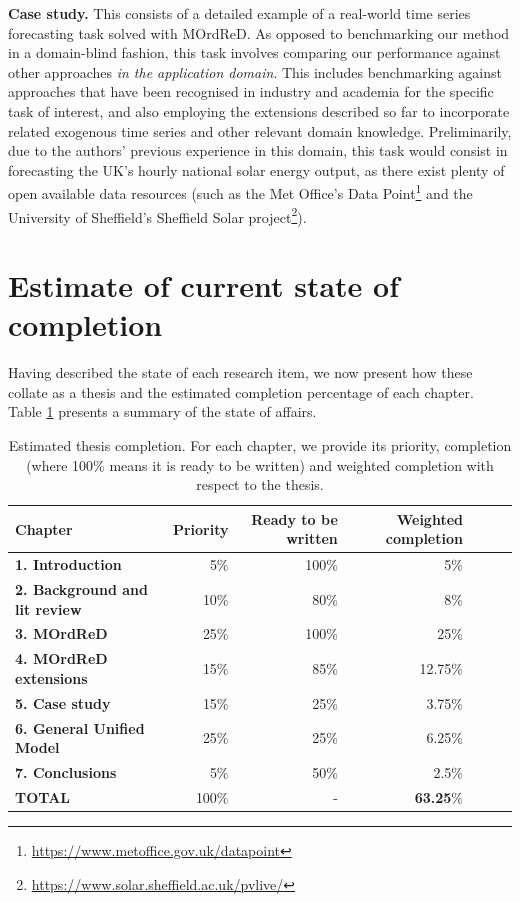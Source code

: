 \documentclass[pdftex,12pt,a4paper]{article}
\theoremstyle{definition}
\theoremstyle{remark}
\begin{document}
\textbf{Case study.} This consists of a detailed example of a real-world time series forecasting task solved with MOrdReD. As opposed to benchmarking our method in a domain-blind fashion, this task involves comparing our performance against other approaches \textit{in the application domain}. This includes benchmarking against approaches that have been recognised in industry and academia for the specific task of interest, and also employing the extensions described so far to incorporate related exogenous time series and other relevant domain knowledge. Preliminarily, due to the authors' previous experience in this domain, this task would consist in forecasting the UK's hourly national solar energy output, as there exist plenty of open available data resources (such as the Met Office's Data Point\footnote{\url{https://www.metoffice.gov.uk/datapoint}} and the University of Sheffield's Sheffield Solar project\footnote{\url{https://www.solar.sheffield.ac.uk/pvlive/}}).


\section{Estimate of current state of completion}
Having described the state of each research item, we now present how these collate as a thesis and the estimated completion percentage of each chapter. Table \ref{tab:completion} presents a summary of the state of affairs.

\begin{table} \centering
\begin{tabular}{lrrrrrr}
\toprule
{Chapter} &     Priority &  Ready to be written &  Weighted completion \\
\midrule
\textbf{1. Introduction} &              5\% &   100\% &            5\% \\
\textbf{2. Background and lit review } &              10\% &   80\% &            8\% \\
\textbf{3. MOrdReD} &              25\% &   100\% &            25\% \\
\textbf{4. MOrdReD extensions} &              15\% &   85\% &            12.75\% \\
\textbf{5. Case study} &              15\% &   25\% &            3.75\%\\
\textbf{6. General Unified Model} &              25\% &   25\% &            6.25\% \\
\textbf{7. Conclusions} &              5\% &   50\% &            2.5\%  \\
\midrule
\textbf{TOTAL} &              100\% &   - &            \textbf{63.25}\%  \\
\bottomrule
\end{tabular}
\caption{Estimated thesis completion. For each chapter, we provide its priority, completion (where 100\% means it is ready to be written) and weighted completion with respect to the thesis.}
\label{tab:completion}
\end{table}
\end{document}
